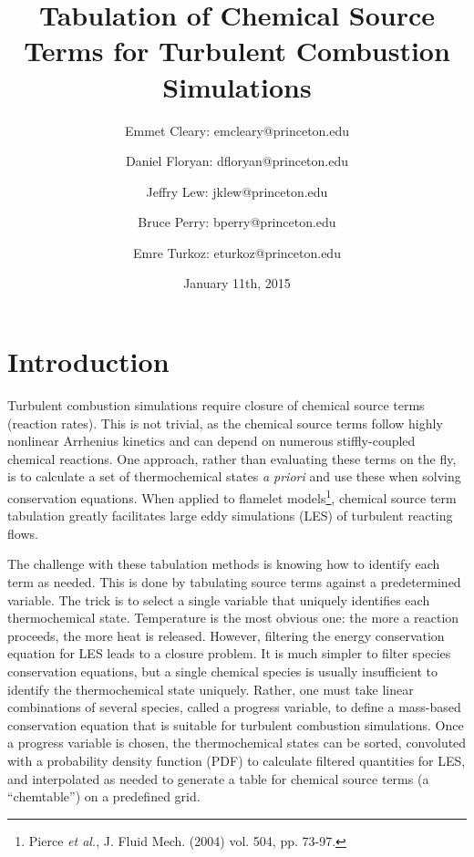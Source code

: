 \documentclass[11pt]{article}
\begin{document}
\title{\textbf{Tabulation of Chemical Source Terms for Turbulent
    Combustion Simulations}}

\author{Emmet Cleary: emcleary@princeton.edu \and Daniel Floryan:
  dfloryan@princeton.edu \and Jeffry Lew: jklew@princeton.edu \and
  Bruce Perry: bperry@princeton.edu \and Emre Turkoz:
  eturkoz@princeton.edu} 

\date{January 11th, 2015 }
\maketitle

\section{Introduction}
Turbulent combustion simulations require closure of chemical source terms (reaction rates). This is not trivial, as the chemical source terms follow highly nonlinear Arrhenius kinetics and can depend on numerous stiffly-coupled chemical reactions. One approach, rather than evaluating these terms on the fly, is to calculate a set of thermochemical states \textit{a priori} and use these when solving conservation equations. When applied to flamelet models\footnote{Pierce \textit{et al.}, J. Fluid Mech. (2004) vol. 504, pp. 73-97.}, chemical source term tabulation greatly facilitates large eddy simulations (LES) of turbulent reacting flows.

The challenge with these tabulation methods is knowing how to identify each term as needed.  This is done by tabulating source terms against a predetermined variable. The trick is to select a single variable that uniquely identifies each thermochemical state. Temperature is the most obvious one: the more a reaction proceeds, the more heat is released. However, filtering the energy conservation equation for LES leads to a closure problem. It is much simpler to filter species conservation equations, but a single chemical species is usually insufficient to identify the thermochemical state uniquely. Rather, one must take linear combinations of several species, called a progress variable, to define a mass-based conservation equation that is suitable for turbulent combustion simulations. Once a progress variable is chosen, the thermochemical states can be sorted, convoluted with a probability density function (PDF) to calculate filtered quantities for LES, and interpolated as needed to generate a table for chemical source terms (a “chemtable”) on a predefined grid.
\end{document}
